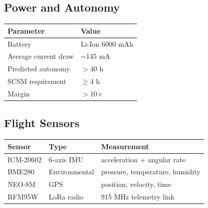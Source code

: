 
\subsection{Power and Autonomy}

\begin{center}
{\small
\setlength{\tabcolsep}{6pt}
\begin{tabular}{>{\raggedright}p{5.2cm}l}
\toprule
\textbf{Parameter} & \textbf{Value} \\
\midrule
Battery & Li-Ion 6000 mAh \\
Average current draw & $\sim$145 mA \\
Predicted autonomy & $>$40 h \\
SCSM requirement & $\geq$4 h \\
Margin & $>$10$\times$ \\
\bottomrule
\end{tabular}
}
\end{center}

\subsection{Flight Sensors}

\begin{center}
{\small
\setlength{\tabcolsep}{6pt}
\begin{tabular}{>{\raggedright}p{3.2cm}ll}
\toprule
\textbf{Sensor} & \textbf{Type} & \textbf{Measurement} \\
\midrule
ICM-20602 & 6-axis IMU & acceleration + angular rate \\
BME280 & Environmental & pressure, temperature, humidity \\
NEO-8M & GPS & position, velocity, time \\
RFM95W & LoRa radio & 915 MHz telemetry link \\
\bottomrule
\end{tabular}
}
\end{center}

